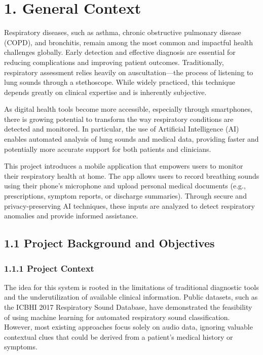 \section*{1. General Context}

Respiratory diseases, such as asthma, chronic obstructive pulmonary disease (COPD), and bronchitis, remain among the most common and impactful health challenges globally. Early detection and effective diagnosis are essential for reducing complications and improving patient outcomes. Traditionally, respiratory assessment relies heavily on auscultation—the process of listening to lung sounds through a stethoscope. While widely practiced, this technique depends greatly on clinical expertise and is inherently subjective.

As digital health tools become more accessible, especially through smartphones, there is growing potential to transform the way respiratory conditions are detected and monitored. In particular, the use of Artificial Intelligence (AI) enables automated analysis of lung sounds and medical data, providing faster and potentially more accurate support for both patients and clinicians.

This project introduces a mobile application that empowers users to monitor their respiratory health at home. The app allows users to record breathing sounds using their phone’s microphone and upload personal medical documents (e.g., prescriptions, symptom reports, or discharge summaries). Through secure and privacy-preserving AI techniques, these inputs are analyzed to detect respiratory anomalies and provide informed assistance.

\subsection*{1.1 Project Background and Objectives}

\subsubsection*{1.1.1 Project Context}

The idea for this system is rooted in the limitations of traditional diagnostic tools and the underutilization of available clinical information. Public datasets, such as the ICBHI 2017 Respiratory Sound Database, have demonstrated the feasibility of using machine learning for automated respiratory sound classification. However, most existing approaches focus solely on audio data, ignoring valuable contextual clues that could be derived from a patient's medical history or symptoms.

